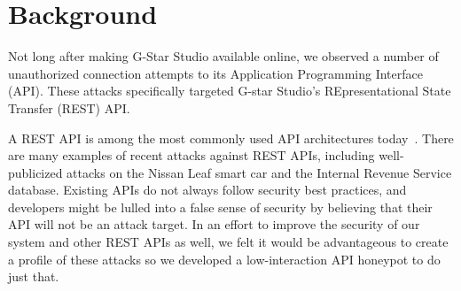 
\section{Background} \label{background}

Not long after making G-Star Studio available online, we observed a number of unauthorized connection attempts to its Application Programming Interface (API).  
These attacks specifically targeted G-star Studio's REpresentational State Transfer (REST) API.

A REST API is among the most commonly used API architectures today~\cite{REST-API-use}.
There are many examples of recent attacks against REST APIs, including well-publicized attacks on the Nissan Leaf smart car
and the Internal Revenue Service database.
Existing APIs do not always follow security best practices, and developers might be lulled into a false sense of security by believing that their API will not be an attack target.  
In an effort to improve the security of our system and other REST APIs as well, we felt it would be advantageous to create a profile of these attacks so we developed a low-interaction API honeypot to do just that.


